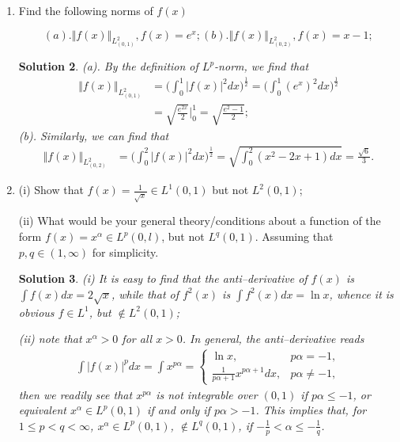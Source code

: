 \documentclass[6pt]{article}
\newtheorem{solution}{Solution}
\numberwithin{equation}{section}
\begin{document}
\begin{enumerate}
\begin{solution}
I would like to comment that this explicit solution is available for this particular utility function, and in general, the PDE or HJB system can not be solved explicitly, at least NOT by the method of separation of variables.
\end{solution}

\item   Find the following norms of $f(x)$

\[(a).  \Vert f(x) \Vert_{L^2_{(0,1)}}, f(x)=e^x;  (b). \Vert f(x) \Vert_{L^2_{(0,2)}}, f(x)=x-1; \]
\begin{solution}
(a). By the definition of $L^p$-norm, we find that
\begin{align*}
\Vert f(x) \Vert_{L^2_{(0,1)}}&=\Big(\int_{0}^1 |f(x)|^2 dx\Big)^{\frac{1}{2}}=\Big(\int_{0}^1 (e^{x})^2 dx\Big)^{\frac{1}{2}}\\
&=\sqrt{\frac{e^{2x}}{2}}\Big |^1_0=\sqrt{\frac{e^2-1}{2}};
\end{align*}
(b). Similarly, we can find that
\begin{align*}
\Vert f(x) \Vert_{L^2_{(0,2)}}&=\Big(\int_{0}^2 |f(x)|^2 dx\Big)^{\frac{1}{2}}=\sqrt{\int_0^2 (x^2-2x+1)dx}=\frac{\sqrt{6}}{3}.
\end{align*}
\end{solution}

\item (i)  Show that $f(x)=\frac{1}{\sqrt x}\in L^1(0,1)$ but not $L^2(0,1)$;

(ii)  What would be your general theory/conditions about a function of the form $f(x)=x^\alpha\in L^p(0,l)$, but not $L^q(0,1)$.  Assuming that $p,q\in(1,\infty)$ for simplicity.
\begin{solution}
(i)  It is easy to find that the anti--derivative of $f(x)$ is $\int f(x)dx=2\sqrt x$, while that of $f^2(x)$ is $\int f^2(x)dx=\ln x$, whence it is obvious $f\in L^1$, but $\not \in L^2 (0,1)$;

(ii) note that $x^\alpha>0$ for all $x>0$.  In general, the anti--derivative reads
\begin{align*}\int |f (x)|^pdx=\int x^{p\alpha}=
\begin{cases}
\ln x,&p\alpha=-1,\\
\frac{1}{p\alpha+1} x^{p\alpha+1}dx,&p\alpha\neq-1,
\end{cases}
\end{align*}
then we readily see that $x^{p\alpha}$ is not integrable over $(0,1)$ if $p\alpha\leq-1$, or equivalent $x^\alpha \in L^p(0,1)$ if and only if $p\alpha>-1$.  This implies that, for $1\leq p<q<\infty$, $x^\alpha \in L^p(0,1)$, $\not \in L^q(0,1)$, if $-\frac{1}{p}<\alpha \leq -\frac{1}{q}$.
\end{solution}


\end{enumerate}
\end{document}
